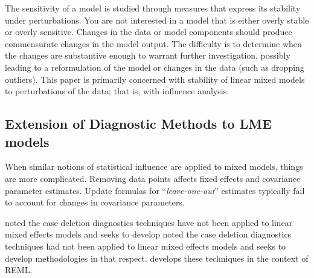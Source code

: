 \documentclass[12pt, a4paper]{article}
\begin{document}
			The sensitivity of a model is studied through measures that express its stability under perturbations. You
			are not interested in a model that is either overly stable or overly sensitive. Changes in the data or model
			components should produce commensurate changes in the model output. The difficulty is to determine
			when the changes are substantive enough to warrant further investigation, possibly leading to a reformulation
			of the model or changes in the data (such as dropping outliers). This paper is primarily concerned
			with stability of linear mixed models to perturbations of the data; that is, with influence analysis. 
			

			\subsection{Extension of Diagnostic Methods to LME models}
			
			
			When similar notions of statistical influence are applied to mixed models,
			things are more complicated. Removing data points affects fixed effects and covariance parameter estimates.
			Update formulas for “\textit{leave-one-out}” estimates typically fail to account for changes in covariance
			parameters. 
			
			\citet{Christiansen} noted the case deletion diagnostics techniques have not been applied to linear mixed effects models and seeks to develop 
			\citet{CPJ} noted the case deletion diagnostics techniques had not been applied to linear mixed effects models and seeks to develop methodologies in that respect. \citet{CPJ} develops these techniques in the context of REML.
			
			
			
\end{document}
